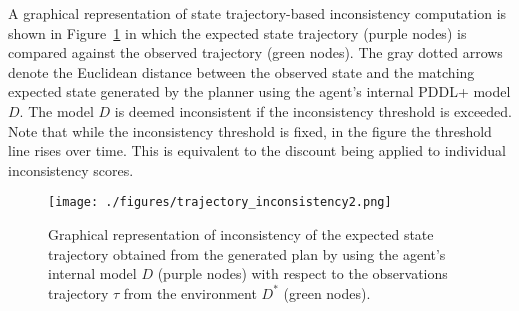 \documentclass[letterpaper]{article} %
\newcommand{\sbirds}{Science Birds\xspace} %
\newcommand{\roni}[1]{{\textcolor{green}{[Roni: #1]}}}
\begin{document}
A graphical representation of state trajectory-based inconsistency computation is shown in Figure~\ref{fig:inconsistency_trajectory} in which the expected state trajectory (purple nodes) is compared against the observed trajectory (green nodes). The gray dotted arrows denote the Euclidean distance between the observed state and the matching expected state generated by the planner using the agent's internal PDDL+ model $D$. The model $D$ is deemed inconsistent if the inconsistency threshold is exceeded. Note that while the inconsistency threshold is fixed, in the figure the threshold line rises over time. This is equivalent to the discount being applied to individual inconsistency scores.





\begin{figure}
	\centering
	\texttt{[image: ./figures/trajectory\_inconsistency2.png]}
	\caption{Graphical representation of inconsistency of the expected state trajectory obtained from the generated plan by using the agent's internal model $D$ (purple nodes) with respect to the observations trajectory $\tau$ from the environment $D^*$ (green nodes).}
	\label{fig:inconsistency_trajectory}
\end{figure}

\end{document}
